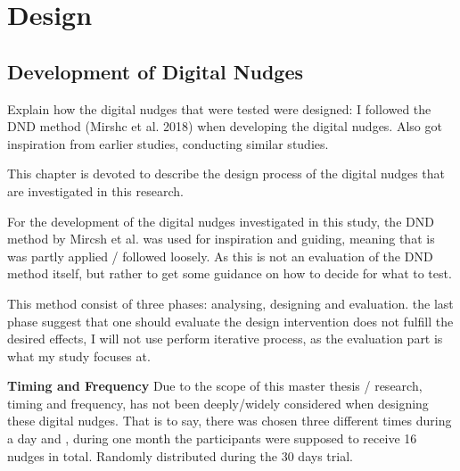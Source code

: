\chapter{Design}

\section{Development of Digital Nudges} 
Explain how the digital nudges that were tested were designed:
I followed the DND method (Mirshc et al. 2018) when developing the digital nudges. 
Also got inspiration from earlier studies, conducting similar studies. 

This chapter is devoted to describe the design process of the digital nudges that are investigated in this research. 

For the development of the digital nudges investigated in this study, the DND method by Mircsh et al. was used for inspiration and guiding, meaning that is was partly applied / followed loosely. As this is not an evaluation of the DND method itself, but rather to get some guidance on how to decide for what to test. 

This method consist of three phases: analysing, designing and evaluation. the last phase suggest that one should evaluate the design intervention does not fulfill the desired effects, I will not use perform iterative process, as the evaluation part is what my study focuses at. 

\textbf{Timing and Frequency }
Due to the scope of this master thesis / research, timing and frequency, has not been deeply/widely considered when designing these digital nudges.  That is to say, there was chosen three different times during a day and , during one month the participants were supposed to receive 16 nudges in total. Randomly distributed during the 30 days trial.  




